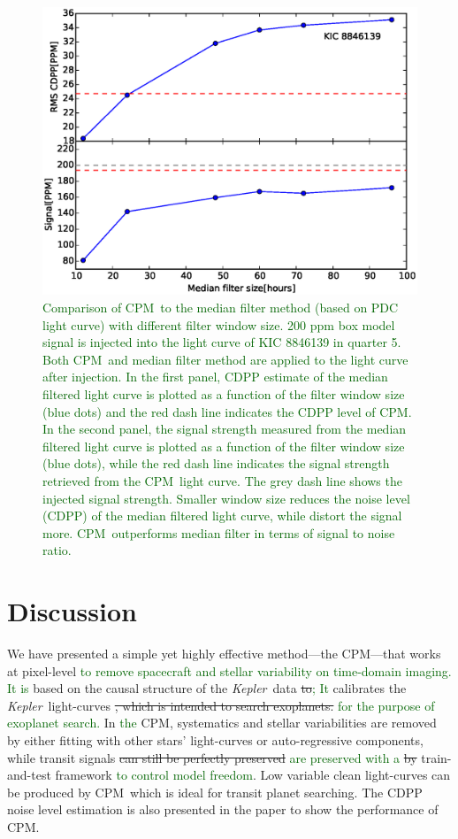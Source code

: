 \documentclass[12pt, preprint]{aastex}
\newcommand{\project}[1]{\textsl{#1}}
\newcommand{\Kepler}{\project{Kepler}}
\newcommand{\name}{CPM}
\newcommand{\revise}[1]{\textcolor{darkgreen}{#1}}
\newcommand{\remove}[1]{\sout{#1}}
\begin{document}
\begin{figure}[p]
\begin{center}
\includegraphics[width=\textwidth]{f7a}
\end{center}
\caption{
  \label{filter} 
\revise{Comparison of \name\ to the median filter method (based on PDC light curve) with different filter window size. 200 ppm box model signal is injected into the light curve of KIC 8846139 in quarter 5. Both \name\ and median filter method are applied to the light curve after injection. In the first panel, CDPP estimate of the median filtered light curve is plotted as a function of the filter window size (blue dots) and the red dash line indicates the CDPP level of CPM. In the second panel, the signal strength measured from the median filtered light curve is plotted as a function of the filter window size (blue dots), while the red dash line indicates the signal strength retrieved from the \name\ light curve. The grey dash line shows the injected signal strength. Smaller window size reduces the noise level (CDPP) of the median filtered light curve, while distort the signal more. \name\ outperforms median filter in terms of signal to noise ratio.}
}
\end{figure}

\section{Discussion}
We have presented a simple yet highly effective method---the \name---that works at pixel-level \revise{to remove spacecraft and stellar variability on time-domain imaging. It is} based on the causal structure of the \Kepler\ data \remove{to}\revise{; It} calibrates the \Kepler\ light-curves \remove{, which is intended to search exoplanets.} \revise{for the purpose of exoplanet search.}
In \revise{the} \name, systematics and stellar variabilities are removed by
  either fitting with other stars' light-curves or auto-regressive components, while transit signals \remove{can still be perfectly preserved} \revise{are preserved with a} \remove{by} train-and-test framework \revise{to control model freedom}.
Low variable clean light-curves can be produced by \name\,  
  which is ideal for transit planet searching. 
The CDPP noise level estimation is also presented in the paper to show the performance of \name. 
\end{document}
